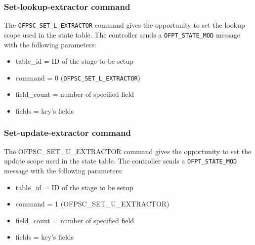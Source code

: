 


\subsubsection{Set-lookup-extractor command}
\label{subsec:set_l_extr}

The \texttt{OFPSC\_SET\_L\_EXTRACTOR} command gives the opportunity to set the lookup scope used in the state table.
The controller sends a \texttt{OFPT\_STATE\_MOD} message with the following parameters:

\begin{itemize}
\item table\_id = ID of the stage to be setup
\item command = 0 (\texttt{OFPSC\_SET\_L\_EXTRACTOR})
\item field\_count = number of specified field 
\item fields = key’s fields
\end{itemize}


\subsubsection{Set-update-extractor command}
\label{subsec:set_u_extr}

The OFPSC\_SET\_U\_EXTRACTOR command gives the opportunity to set the update scope used in the state table.
The controller sends a \texttt{OFPT\_STATE\_MOD} message with the following parameters:

\begin{itemize}
\item table\_id = ID of the stage to be setup
\item command = 1 (OFPSC\_SET\_U\_EXTRACTOR)
\item field\_count = number of specified field 
\item fields = key’s fields
\end{itemize}

